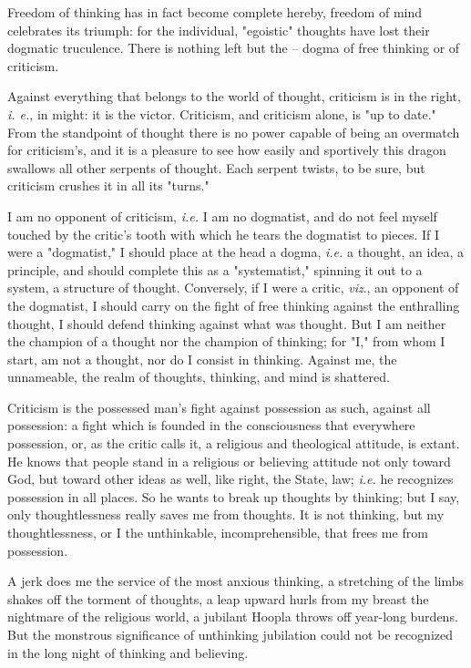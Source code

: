 \documentclass[a4paper]{book}
\begin{document}
Freedom of thinking has in fact become complete hereby, freedom of mind 
celebrates its triumph: for the individual, "{}egoistic"{} thoughts have lost 
their dogmatic truculence. There is nothing left but the -- dogma of free 
thinking or of criticism.

Against everything that belongs to the world of thought, criticism is in the 
right, \textit{i. e.}, in might: it is the victor. Criticism, and criticism 
alone, is "{}up to date."{} From the standpoint of thought there is no power 
capable of being an overmatch for criticism's, and it is a pleasure to see how 
easily and sportively this dragon swallows all other serpents of thought. Each 
serpent twists, to be sure, but criticism crushes it in all its "{}turns."{}

I am no opponent of criticism, \textit{i.e.} I am no dogmatist, and do not 
feel myself touched by the critic's tooth with which he tears the dogmatist to 
pieces. If I were a "{}dogmatist,"{} I should place at the head a dogma, 
\textit{i.e.} a thought, an idea, a principle, and should complete this as a 
"{}systematist,"{} spinning it out to a system, a structure of thought. 
Conversely, if I were a critic, \textit{viz}., an opponent of the dogmatist, I 
should carry on the fight of free thinking against the enthralling thought, I 
should defend thinking against what was thought. But I am neither the champion 
of a thought nor the champion of thinking; for "{}I,"{} from whom I start, am 
not a thought, nor do I consist in thinking. Against me, the unnameable, the 
realm of thoughts, thinking, and mind is shattered.

Criticism is the possessed man's fight against possession as such, against all 
possession: a fight which is founded in the consciousness that everywhere 
possession, or, as the critic calls it, a religious and theological attitude, 
is extant. He knows that people stand in a religious or believing attitude not 
only toward God, but toward other ideas as well, like right, the State, law; 
\textit{i.e.} he recognizes possession in all places. So he wants to break up 
thoughts by thinking; but I say, only thoughtlessness really saves me from 
thoughts. It is not thinking, but my thoughtlessness, or I the unthinkable, 
incomprehensible, that frees me from possession.

A jerk does me the service of the most anxious thinking, a stretching of the 
limbs shakes off the torment of thoughts, a leap upward hurls from my breast 
the nightmare of the religious world, a jubilant Hoopla throws off year-long 
burdens. But the monstrous significance of unthinking jubilation could not be 
recognized in the long night of thinking and believing.
\end{document}
